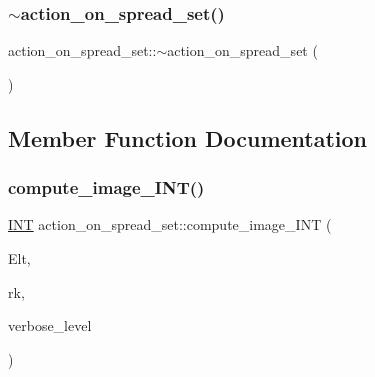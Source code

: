 \subsubsection{\texorpdfstring{$\sim$action\+\_\+on\+\_\+spread\+\_\+set()}{~action\_on\_spread\_set()}}
{\footnotesize\ttfamily action\+\_\+on\+\_\+spread\+\_\+set\+::$\sim$action\+\_\+on\+\_\+spread\+\_\+set (\begin{DoxyParamCaption}{ }\end{DoxyParamCaption})}



\subsection{Member Function Documentation}
\mbox{\label{classaction__on__spread__set_a424ae719c98b5d99978e60f8f2d65437}} 
\subsubsection{\texorpdfstring{compute\+\_\+image\+\_\+\+I\+N\+T()}{compute\_image\_INT()}}
{\footnotesize\ttfamily \mbox{\hyperlink{galois_8h_a09fddde158a3a20bd2dcadb609de11dc}{I\+NT}} action\+\_\+on\+\_\+spread\+\_\+set\+::compute\+\_\+image\+\_\+\+I\+NT (\begin{DoxyParamCaption}\item[{\mbox{\hyperlink{galois_8h_a09fddde158a3a20bd2dcadb609de11dc}{I\+NT}} $\ast$}]{Elt,  }\item[{\mbox{\hyperlink{galois_8h_a09fddde158a3a20bd2dcadb609de11dc}{I\+NT}}}]{rk,  }\item[{\mbox{\hyperlink{galois_8h_a09fddde158a3a20bd2dcadb609de11dc}{I\+NT}}}]{verbose\+\_\+level }\end{DoxyParamCaption})}

\mbox{\label{classaction__on__spread__set_a9ec506244bfeced780bfc61ce83f5386}} 
